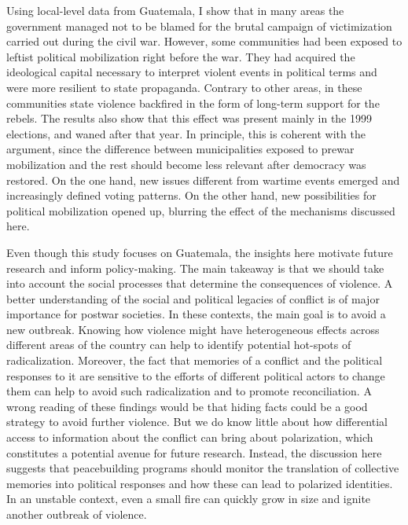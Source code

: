 \documentclass[12pt, notitlepage]{article}
\begin{document}
Using local-level data from Guatemala, I show that in many areas the government managed not to be blamed for the brutal campaign of victimization carried out during the civil war.
However, some communities had been exposed to leftist political mobilization right before the war.
They had acquired the ideological capital necessary to interpret violent events in political terms and were more resilient to state propaganda.
Contrary to other areas, in these communities state violence backfired in the form of long-term support for the rebels.
The results also show that this effect was present mainly in the 1999 elections, and waned after that year.
In principle, this is coherent with the argument, since the difference between municipalities exposed to prewar mobilization and the rest should become less relevant after democracy was restored.
On the one hand, new issues different from wartime events emerged and increasingly defined voting patterns.
On the other hand, new possibilities for political mobilization opened up, blurring the effect of the mechanisms discussed here.

Even though this study focuses on Guatemala, the insights here motivate future research and inform policy-making.
The main takeaway is that we should take into account the social processes that determine the consequences of violence.
A better understanding of the social and political legacies of conflict is of major importance for postwar societies.
In these contexts, the main goal is to avoid a new outbreak.
Knowing how violence might have heterogeneous effects across different areas of the country can help to identify potential hot-spots of radicalization.
Moreover, the fact that memories of a conflict and the political responses to it are sensitive to the efforts of different political actors to change them can help to avoid such radicalization and to promote reconciliation.
A wrong reading of these findings would be that hiding facts could be a good strategy to avoid further violence.
But we do know little about how differential access to information about the conflict can bring about polarization, which constitutes a potential avenue for future research.
Instead, the discussion here suggests that peacebuilding programs should monitor the translation of collective memories into political responses and how these can lead to polarized identities.
In an unstable context, even a small fire can quickly grow in size and ignite another outbreak of violence.

\clearpage



% 
\end{document}
